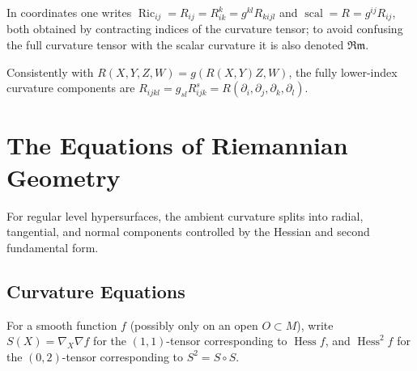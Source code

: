 \begin{remark}
  \label{rem:pet-ch3-ricci-scalar-index-notation}


  In coordinates one writes $\operatorname{Ric}_{ij}=R_{ij}=R^k_{ik}=g^{kl}R_{kijl}$ and
  $\operatorname{scal}=R=g^{ij}R_{ij}$, both obtained by contracting indices of the curvature
  tensor; to avoid confusing the full curvature tensor with the scalar curvature
  it is also denoted $\mathfrak{Rm}$.
\end{remark}

\begin{remark}
  \label{rem:pet-ch3-curvature-index-conventions}


  Consistently with $R(X,Y,Z,W)=g(R(X,Y)Z,W)$, the fully lower-index curvature
  components are $R_{ijkl}=g_{sl}R^s_{ijk}=R(\partial_i,\partial_j,\partial_k,\partial_l)$.
\end{remark}

\section{The Equations of Riemannian Geometry}

For regular level hypersurfaces, the ambient curvature splits into radial,
tangential, and normal components controlled by the Hessian and second
fundamental form.

\subsection{Curvature Equations}

\begin{definition}
  \label{def:pet-ch3-hessian-square-notation}


  For a smooth function $f$ (possibly only on an open $O\subset M$), write
  $S(X)=\nabla_X\nabla f$ for the $(1,1)$-tensor corresponding to
  $\operatorname{Hess}f$, and $\operatorname{Hess}^2f$ for the $(0,2)$-tensor
  corresponding to $S^2=S\circ S$.
\end{definition}

